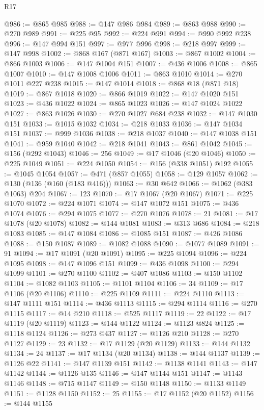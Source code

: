 \begin{lexlean}{R17}
\begin{coremodule}
@986 := @865 @985
@988 := @147 @986 @984
@989 := @863 @988
@990 := @270 @989
@991 := @225 @95
@992 := @224 @991
@994 := @990 @992 @238
@996 := @147 @994 @151
@997 := @977 @996
@998 := @218 @997
@999 := @147 @998
@1002 := @868 @167 (@871 @167)
@1003 := @867 @1002
@1004 := @866 @1003
@1006 := @147 @1004 @151
@1007 := @436 @1006
@1008 := @865 @1007
@1010 := @147 @1008 @1006
@1011 := @863 @1010
@1014 := @270 @1011 @227 @238
@1015 := @147 @1014
@1018 := @868 @18 (@871 @18)
@1019 := @867 @1018
@1020 := @866 @1019
@1022 := @147 @1020 @151
@1023 := @436 @1022
@1024 := @865 @1023
@1026 := @147 @1024 @1022
@1027 := @863 @1026
@1030 := @270 @1027 @684 @238
@1032 := @147 @1030 @151
@1033 := @1015 @1032
@1034 := @218 @1033
@1036 := @147 @1034 @151
@1037 := @999 @1036
@1038 := @218 @1037
@1040 := @147 @1038 @151
@1041 := @959 @1040
@1042 := @218 @1041
@1043 := @861 @1042
@1045 := @156 (@292 @1043)
@1046 := 256
@1049 := @17 @1046 (@20 @1046)
@1050 := @225 @1049
@1051 := @224 @1050
@1054 := @156 (@338 @1051) @192
@1055 := @1045 @1054
@1057 := @471 (@857 @1055)
@1058 := @129 @1057
@1062 := @130 (@136 (@160 (@183 @416)))
@1063 := @30 @642
@1066 := @1062 (@383 @1063) @204
@1067 := 123
@1070 := @17 @1067 (@20 @1067)
@1071 := @225 @1070
@1072 := @224 @1071
@1074 := @147 @1072 @151
@1075 := @436 @1074
@1076 := @294 @1075
@1077 := @270 @1076
@1078 := 21
@1081 := @17 @1078 (@20 @1078)
@1082 := @144 @1081
@1083 := @313 @686
@1084 := @218 @1083
@1085 := @147 @1084
@1086 := @1085 @151
@1087 := @426 @1086
@1088 := @150 @1087
@1089 := @1082 @1088
@1090 := @1077 @1089
@1091 := 91
@1094 := @17 @1091 (@20 @1091)
@1095 := @225 @1094
@1096 := @224 @1095
@1098 := @147 @1096 @151
@1099 := @436 @1098
@1100 := @294 @1099
@1101 := @270 @1100
@1102 := @407 @1086
@1103 := @150 @1102
@1104 := @1082 @1103
@1105 := @1101 @1104
@1106 := 34
@1109 := @17 @1106 (@20 @1106)
@1110 := @225 @1109
@1111 := @224 @1110
@1113 := @147 @1111 @151
@1114 := @436 @1113
@1115 := @294 @1114
@1116 := @270 @1115
@1117 := @14 @210
@1118 := @525 @1117
@1119 := 22
@1122 := @17 @1119 (@20 @1119)
@1123 := @144 @1122
@1124 := @1123 @824
@1125 := @1118 @1124
@1126 := @273 @437
@1127 := @1126 @210
@1128 := @270 @1127
@1129 := 23
@1132 := @17 @1129 (@20 @1129)
@1133 := @144 @1132
@1134 := 24
@1137 := @17 @1134 (@20 @1134)
@1138 := @144 @1137
@1139 := @1126 @22
@1141 := @147 @1139 @151
@1142 := @1138 @1141
@1143 := @147 @1142
@1144 := @1126 @135
@1146 := @147 @1144 @151
@1147 := @1143 @1146
@1148 := @715 @1147
@1149 := @150 @1148
@1150 := @1133 @1149
@1151 := @1128 @1150
@1152 := 25
@1155 := @17 @1152 (@20 @1152)
@1156 := @144 @1155

\end{coremodule}
\end{lexlean}
